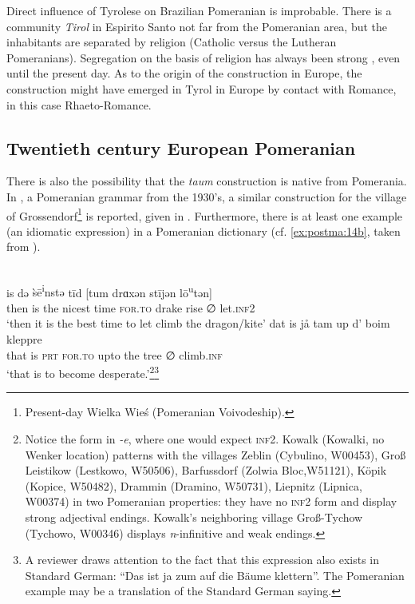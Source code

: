 \documentclass[output=paper,hidelinks,draftmode]{langscibook}
\begin{document}
Direct influence of Tyrolese on Brazilian Pomeranian is improbable. There is a community \textit{Tirol} in Espirito Santo not far from the Pomeranian area, but the inhabitants are separated by religion (Catholic versus the Lutheran Pomeranians). Segregation on the basis of religion has always been strong \citep{Schabus2009}, even until the present day. As to the origin of the construction in Europe, the construction might have emerged in Tyrol in Europe by contact with Romance, in this case Rhaeto-Romance.

\subsection{Twentieth century European Pomeranian}

There is also the possibility that the \textit{taum} construction is native from Pomerania. In \citet[69]{Stritzel1974}, a Pomeranian grammar from the 1930's, a similar construction for the village of Grossendorf\footnote{Present-day Wielka Wieś (Pomeranian Voivodeship).} is reported, given in . Furthermore, there is at least one example (an idiomatic expression) in a Pomeranian dictionary (cf. \ref{ex:postma:14b}, taken from \citealt{Laude1995}).


\ea {}\\
\ea\label{ex:postma:14a}  is {də} {\`{s}\={e}\textsuperscript{i}nstə} {t\={i}d} [tum {drɑxən} {st\={i}jən} {} l\={o}\textsuperscript{u}tən] \\
     then is the nicest time \textsc{for.to} drake rise ∅ let.\textsc{inf2}\\
\glt {}`then it is the best time to let climb the dragon/kite'
\ex\label{ex:postma:14b} \gll dat is jå tam up d' boim {} kleppre \\
     that is \textsc{prt} \textsc{for.to} upto the tree ∅ climb.\textsc{inf}\\
\glt {}`that is to become desperate.'\footnote{Notice the form in \textit{{}-e}, where one would expect \textsc{inf2}. Kowalk (Kowalki, no Wenker location) patterns with the villages Zeblin (Cybulino, W00453), Groß Leistikow (Lestkowo, W50506), Barfussdorf (Zolwia Bloc,W51121), Köpik (Kopice, W50482), Drammin (Dramino, W50731), Liepnitz (Lipnica, W00374) in two Pomeranian properties: they have no \textsc{inf2} form and display strong adjectival endings. Kowalk's neighboring village Groß-Tychow (Tychowo, W00346) displays \textit{n}-infinitive and weak endings.}\footnote{A reviewer draws attention to the fact that this expression also exists in Standard German: ``Das ist ja zum auf die Bäume klettern''. The Pomeranian example may be a translation of the Standard German saying.}\z\z
\end{document}
